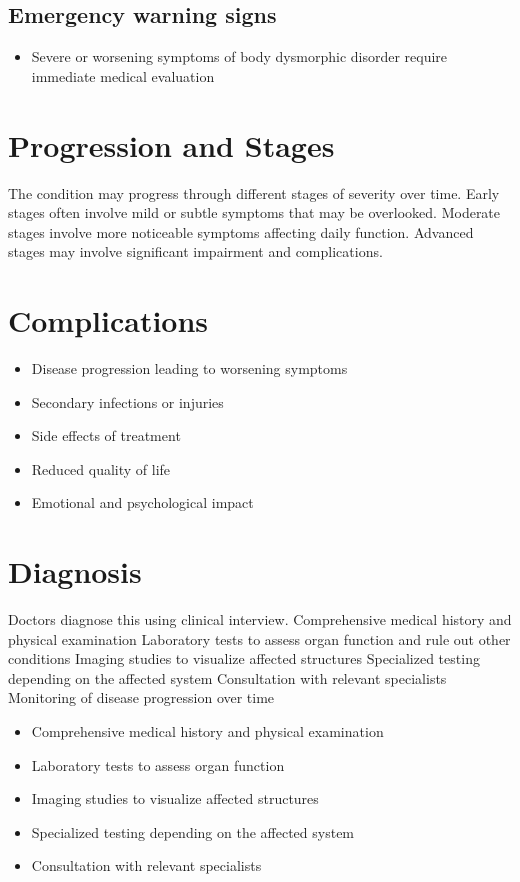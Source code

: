 \subsection{Emergency warning signs}
\begin{itemize}[noitemsep]
  \item Severe or worsening symptoms of body dysmorphic disorder require immediate medical evaluation
\end{itemize}
\section{Progression and Stages}
The condition may progress through different stages of severity over time. Early stages often involve mild or subtle symptoms that may be overlooked. Moderate stages involve more noticeable symptoms affecting daily function. Advanced stages may involve significant impairment and complications.
\section{Complications}
\begin{itemize}[noitemsep]
  \item Disease progression leading to worsening symptoms
  \item Secondary infections or injuries
  \item Side effects of treatment
  \item Reduced quality of life
  \item Emotional and psychological impact
\end{itemize}
\section{Diagnosis}
Doctors diagnose this using clinical interview. Comprehensive medical history and physical examination Laboratory tests to assess organ function and rule out other conditions Imaging studies to visualize affected structures Specialized testing depending on the affected system Consultation with relevant specialists Monitoring of disease progression over time

\begin{itemize}[noitemsep]
  \item Comprehensive medical history and physical examination
  \item Laboratory tests to assess organ function
  \item Imaging studies to visualize affected structures
  \item Specialized testing depending on the affected system
  \item Consultation with relevant specialists
\end{itemize}
